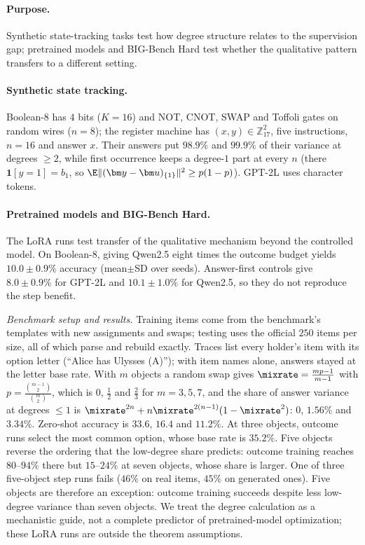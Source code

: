 \paragraph{Purpose.} Synthetic state-tracking tasks test how degree structure relates to the supervision gap;
pretrained models and BIG-Bench Hard test whether the qualitative pattern transfers to a different setting.

\paragraph{Synthetic state tracking.} Boolean-8 has $4$ bits ($K=16$) and NOT, CNOT, SWAP and Toffoli gates on random wires ($n=8$); the register
machine has $(x,y)\in\mathbb Z_{17}^2$, five instructions, $n=16$ and answer $x$. Their answers put $98.9\%$ and $99.9\%$ of their
variance at degrees $\ge2$, while first occurrence keeps a degree-$1$ part at every $n$ (there $\mathbf 1[y=1]=b_1$, so $\E\|(\bm y-\bm u)_{\{1\}}\|^2\ge p(1-p)$). GPT-2L uses character tokens. \paragraph{Pretrained models and BIG-Bench Hard.} The LoRA runs test transfer of the qualitative mechanism beyond the controlled model.
On Boolean-8, giving Qwen2.5 eight times the outcome budget yields $10.0\pm0.9\%$ accuracy (mean$\pm$SD over seeds).
Answer-first controls give $8.0\pm0.9\%$ for GPT-2L and $10.1\pm1.0\%$ for Qwen2.5, so they do not reproduce the step benefit.



\noindent\begin{minipage}{\linewidth}
\emph{Benchmark setup and results.} Training items come from the benchmark's templates with new assignments and swaps; testing uses
the official $250$ items per size, all of which parse and rebuild exactly. Traces list every holder's item with its
option letter (``Alice has Ulysses (A)''); with item names alone, answers stayed at the letter base rate. With $m$
objects a random swap gives $\mixrate=\frac{mp-1}{m-1}$ with $p=\frac{\binom{m-1}{2}}{\binom{m}{2}}$, which is $0$, $\tfrac{1}{2}$ and $\tfrac{2}{3}$ for $m=3,5,7$, and the
share of answer variance at degrees $\le1$ is $\mixrate^{2n}+n\mixrate^{2(n-1)}(1-\mixrate^2)$: $0$, $1.56\%$ and $3.34\%$. Zero-shot accuracy is
$33.6$, $16.4$ and $11.2\%$. At three objects, outcome runs select the most common option, whose base rate is $35.2\%$.
Five objects reverse the ordering that the low-degree share predicts: outcome training reaches $80$--$94\%$ there but
$15$--$24\%$ at seven objects, whose share is larger. One of three five-object step runs fails ($46\%$ on real items, $45\%$ on
generated ones). Five objects are therefore an exception: outcome training succeeds despite less low-degree variance than seven objects.
We treat the degree calculation as a mechanistic guide, not a complete predictor of pretrained-model optimization; these LoRA runs are outside the theorem assumptions.
\end{minipage}





